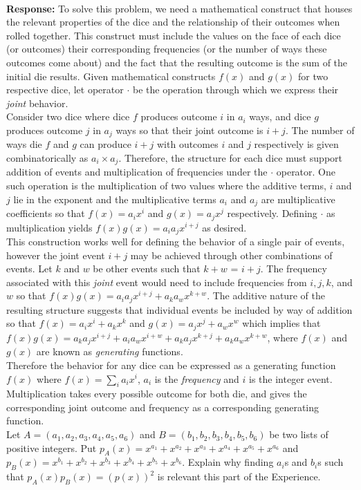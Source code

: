 \documentclass{article}
\newcommand{\response}[1]{\leavevmode\\[0.05in]{\bf Response: } #1 \leavevmode\\[0.05in]}
\begin{document}
\response{To solve this problem, we need a mathematical construct that houses the relevant properties of the dice and the relationship of their outcomes when rolled together. This construct must include the values on the face of each dice (or outcomes) their corresponding frequencies (or the number of ways these outcomes come about) and the fact that the resulting outcome is the sum of the initial die results. Given mathematical constructs $f(x)$ and $g(x)$ for two respective dice, let operator $\cdot$  be the operation through which we express their {\it joint} behavior. \\[0.05in]
Consider two dice where dice $f$ produces outcome $i$ in $a_i$ ways, and dice $g$ produces outcome $j$ in $a_j$ ways so that their joint outcome is $i + j$. The number of ways die $f$ and $g$ can produce $i + j$ with outcomes $i$ and $j$ respectively is given combinatorically as $a_i \times a_j$. Therefore, the structure for each dice must support addition of events and multiplication of frequencies under the $\cdot$ operator. One such operation is the multiplication of two values where the additive terms, $i$ and $j$ lie in the exponent and the multiplicative terms $a_i$ and $a_j$ are multiplicative coefficients so that $f(x) = a_ix^i$ and $g(x) = a_jx^j$ respectively. Defining $\cdot$ as multiplication yields $f(x)g(x) = a_ia_jx^{i + j}$ as desired. \\[0.05in]
This construction works well for defining the behavior of a single pair of events, however the joint event $i + j$ may be achieved through other combinations of events.  Let $k$ and $w$ be other events such that $k + w$ = $i + j$. The frequency associated with this {\it joint} event would need to include frequencies from $i,j,k$, and $w$ so that $f(x)g(x) = a_ia_jx^{i + j} + a_ka_wx^{k + w}$. The additive nature of the resulting structure suggests that individual events be included by way of addition so that $f(x) = a_ix^i + a_kx^k$ and $g(x) = a_jx^j + a_wx^w$ which implies that $f(x)g(x) = a_ka_jx^{i+j} + a_ia_wx^{i+w} + a_ka_jx^{k+j} + a_ka_wx^{k+w}$, where $f(x)$ and $g(x)$ are known as {\it generating} functions. \\[0.05in]
Therefore the behavior for any dice can be expressed as a generating function $f(x)$ where $f(x) = \sum_ia_ix^i$, $a_i$ is the {\it frequency} and $i$ is the integer event. Multiplication takes every possible outcome for both die, and gives the corresponding joint outcome and frequency as a corresponding generating function.} 
  Let $A =(a_1, a_2, a_3, a_4, a_5, a_6)$ and $B = (b_1, b_2, b_3, b_4, b_5, b_6)$ be two lists of positive integers.  Put $p_A(x) = x^{a_1}+x^{a_2} + x^{a_3} + x^{a_4}+x^{a_5} + x^{a_6}$ and $p_B(x) = x^{b_1}+x^{b_2}+x^{b_3}+x^{b_4}+x^{b_5}+x^{b_6}$.  Explain why finding $a_i$s and $b_i$s such that $p_A(x)p_B(x) = (p(x))^2$ is relevant this part of the Experience.
\end{document}
